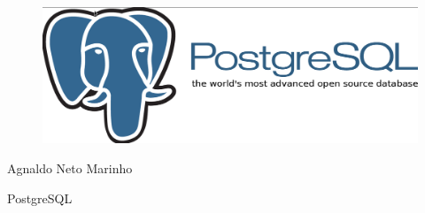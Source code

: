 \thispagestyle{empty}

\begin{center}
  \begin{figure}[H]
    \begin{center}
      \hspace{-1cm}
      \includegraphics[width=0.55\columnwidth]{titlepage}
    \end{center}      
  \end{figure}

  \vskip 2cm

  \hspace{-1cm}
  \begin{minipage}[c]{12cm}
    \begin{center}

{\Huge {}\vskip 0.15cm

{\large Agnaldo Neto Marinho}
}
    \end{center}
  \end{minipage}

  \vskip 16cm

  {\Huge PostgreSQL}

\end{center}
